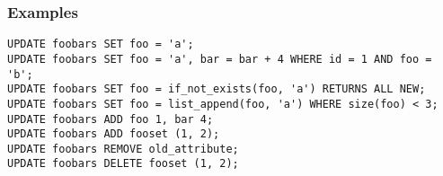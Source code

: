 \subsubsection{Examples}
\lstset{language=Java}
\begin{lstlisting}
UPDATE foobars SET foo = 'a';
UPDATE foobars SET foo = 'a', bar = bar + 4 WHERE id = 1 AND foo = 'b';
UPDATE foobars SET foo = if_not_exists(foo, 'a') RETURNS ALL NEW;
UPDATE foobars SET foo = list_append(foo, 'a') WHERE size(foo) < 3;
UPDATE foobars ADD foo 1, bar 4;
UPDATE foobars ADD fooset (1, 2);
UPDATE foobars REMOVE old_attribute;
UPDATE foobars DELETE fooset (1, 2);	
\end{lstlisting}
\vspace{20pt}